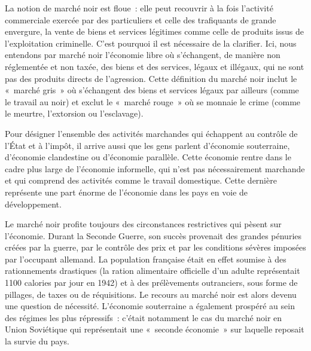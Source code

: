 La notion de marché noir est floue~: elle peut recouvrir à la fois l'activité commerciale exercée par des particuliers et celle des trafiquants de grande envergure, la vente de biens et services légitimes comme celle de produits issus de l'exploitation criminelle. C'est pourquoi il est nécessaire de la clarifier. Ici, nous entendons par marché noir l'économie libre où s'échangent, de manière non réglementée et non taxée, des biens et des services, légaux et illégaux, qui ne sont pas des produits directs de l'agression. Cette définition du marché noir inclut le «~marché gris~» où s'échangent des biens et services légaux par ailleurs (comme le travail au noir) et exclut le «~marché rouge~» où se monnaie le crime (comme le meurtre, l'extorsion ou l'esclavage). %

Pour désigner l'ensemble des activités marchandes qui échappent au contrôle de l'État et à l'impôt, il arrive aussi que les gens parlent d'économie souterraine, d'économie clandestine ou d'économie parallèle. Cette économie rentre dans le cadre plus large de l'économie informelle, qui n'est pas nécessairement marchande et qui comprend des activités comme le travail domestique. Cette dernière représente une part énorme de l'économie dans les pays en voie de développement.

Le marché noir profite toujours des circonstances restrictives qui pèsent sur l'économie. Durant la Seconde Guerre, son succès provenait des grandes pénuries créées par la guerre, par le contrôle des prix et par les conditions sévères imposées par l'occupant allemand. La population française était en effet soumise à des rationnements drastiques (la ration alimentaire officielle d'un adulte représentait 1100 calories par jour en 1942) et à des prélèvements outranciers, sous forme de pillages, de taxes ou de réquisitions. Le recours au marché noir est alors devenu une question de nécessité. L'économie souterraine a également prospéré au sein des régimes les plus répressifs~: c'était notamment le cas du marché noir en Union Soviétique qui représentait une «~seconde économie~» sur laquelle reposait la survie du pays.

